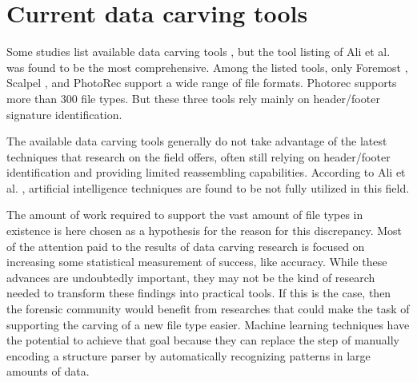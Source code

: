 \section{Current data carving tools}

Some studies list available data carving tools
\cite{ali_review_2018}
\cite{qiu_new_2014}
\cite{nadeem_ashraf_forensic_2013}
\cite{roux_reconstructing_2008}, 
but the tool listing of Ali et al. \cite{ali_review_2018} was found to be the most comprehensive. Among the listed tools, only Foremost \cite{kendall_foremost_2019}, Scalpel \cite{richard_iii_scalpel:_2005}, and PhotoRec \cite{grenier_photorec_2019} support a wide range of file formats. Photorec supports more than 300 file types. But these three tools rely mainly on header/footer signature identification.

The available data carving tools generally do not take advantage of the latest techniques that research on the field offers, often still relying on header/footer identification and providing limited reassembling capabilities.
According to Ali et al. \cite{ali_review_2018}, artificial intelligence techniques are found to be not fully utilized in this field.

The amount of work required to support the vast amount of file types in existence is here chosen as a hypothesis for the reason for this discrepancy. Most of the attention paid to the results of data carving research is focused on increasing some statistical measurement of success, like accuracy. While these advances are undoubtedly important, they may not be the kind of research needed to transform these findings into practical tools. If this is the case, then the forensic community would benefit from researches that could make the task of supporting the carving of a new file type easier. Machine learning techniques have the potential to achieve that goal because they can replace the step of manually encoding a structure parser by automatically recognizing patterns in large amounts of data.

